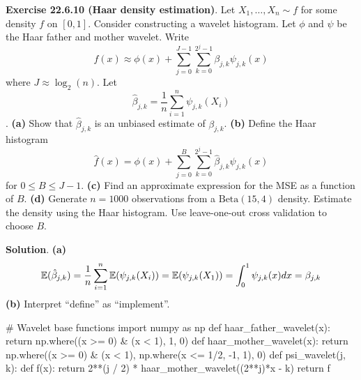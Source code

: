 \textbf{Exercise 22.6.10 (Haar density estimation)}. Let
\(X_{1}, \dots, X_{n} \sim f\) for some density \(f\) on \([0, 1]\).
Consider constructing a wavelet histogram. Let \(\phi\) and \(\psi\) be
the Haar father and mother wavelet. Write
\[
f(x) \approx \phi(x) + \sum_{j=0}^{J - 1} \sum_{k=0}^{2^{j} - 1} \beta_{j, k} \psi_{j, k}(x)
\]
where \(J \approx \log_{2}(n)\). Let
\[
\hat{\beta}_{j, k} = \frac{1}{n} \sum_{i=1}^{n} \psi_{j, k}(X_{i})
\].
\textbf{(a)} Show that \(\hat{\beta}_{j, k}\) is an unbiased estimate of
\(\beta_{j, k}\).
\textbf{(b)} Define the Haar histogram
\[
\hat{f}(x) = \phi(x) + \sum_{j=0}^{B} \sum_{k=0}^{2^{j} - 1} \hat{\beta}_{j, k} \psi_{j, k}(x)
\]
for \(0 \leq B \leq J - 1\).
\textbf{(c)} Find an approximate expression for the MSE as a function of
\(B\).
\textbf{(d)} Generate \(n = 1000\) observations from a
\(\text{Beta}(15, 4)\) density. Estimate the density using the Haar
histogram. Use leave-one-out cross validation to choose \(B\).

\textbf{Solution}.
\textbf{(a)}
\[
\operatorname{\mathbb{E}}(\hat{\beta}_{j, k}) = \frac{1}{n} \sum_{i=1}^{n} \operatorname{\mathbb{E}}(\psi_{j, k}(X_{i}))
= \operatorname{\mathbb{E}}(\psi_{j, k}(X_{1})) = \int_{0}^{1} \psi_{j, k}(x) dx = \beta_{j, k}
\]
\textbf{(b)} Interpret ``define'' as ``implement''.

\begin{python}
# Wavelet base functions
import numpy as np
def haar_father_wavelet(x):
    return np.where((x >= 0) & (x < 1), 1, 0)
def haar_mother_wavelet(x):
    return np.where((x >= 0) & (x < 1),  np.where(x <= 1/2, -1, 1), 0)
def psi_wavelet(j, k):
    def f(x):
        return 2**(j / 2) * haar_mother_wavelet((2**j)*x - k)
    return f
\end{python}

